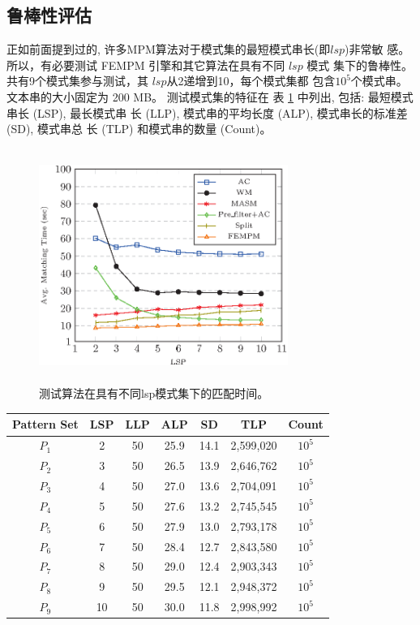 \subsection{鲁棒性评估}

正如前面提到过的, 许多MPM算法对于模式集的最短模式串长(即$lsp$)非常敏
感。 所以，有必要测试 \textsf{FEMPM} 引擎和其它算法在具有不同 $lsp$ 模式
集下的鲁棒性。 共有9个模式集参与测试，其 $lsp$从2递增到10，每个模式集都
包含$10^5$个模式串。 文本串的大小固定为 200 MB。 测试模式集的特征在
表 \ref{tab:lsps} 中列出, 包括: 最短模式串长 (LSP), 最长模式串
长 (LLP), 模式串的平均长度 (ALP), 模式串长的标准差 (SD), 模式串总
长 (TLP) 和模式串的数量 (Count)。

\begin{figure}[H]
  \centering
  \includegraphics[height=3in, width=3.2in]{figures/2_MPM/lsp}
  \caption{测试算法在具有不同lsp模式集下的匹配时间。}
  \label{fig:lsp}
\end{figure}


\begin{table}
  \centering
  \label{tab:lsps}
  \begin{tabular}{ccccccc}
    \hline
    Pattern Set & LSP  & LLP  & ALP & SD & TLP & Count\\
    \hline
    $P_1$ & 2 & 50 & 25.9 & 14.1 & 2,599,020 & $10^5$\\
    $P_2$ & 3 & 50 & 26.5 & 13.9 & 2,646,762 & $10^5$\\
    $P_3$ & 4 & 50 & 27.0 & 13.6 & 2,704,091 & $10^5$\\
    $P_4$ & 5 & 50 & 27.6 & 13.2 & 2,745,545 & $10^5$\\
    $P_5$ & 6 & 50 & 27.9 & 13.0 & 2,793,178 & $10^5$\\
    $P_6$ & 7 & 50 & 28.4 & 12.7 & 2,843,580 & $10^5$\\
    $P_7$ & 8 & 50 & 29.0 & 12.4 & 2,903,343 & $10^5$\\
    $P_8$ & 9 & 50 & 29.5 & 12.1 & 2,948,372 & $10^5$\\
    $P_9$ &10 & 50 & 30.0 & 11.8 & 2,998,992 & $10^5$\\
    \hline
  \end{tabular}
\end{table}


